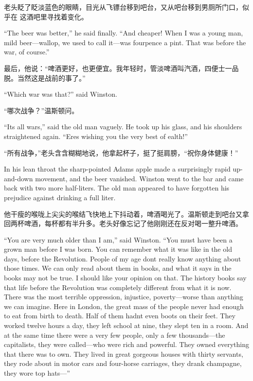 \begin{paracol}{2}
\switchcolumn

老头眨了眨淡蓝色的眼睛，目光从飞镖台移到吧台，又从吧台移到男厕所门口，似乎在
这酒吧里寻找着变化。

\switchcolumn*

``The beer was better,'' he said finally. ``And cheaper! When I was a young
man, mild beer---wallop, we used to call it---was fourpence a pint. That
was before the war, of course.''

\switchcolumn

最后，他说：``啤酒更好，也更便宜。我年轻时，管淡啤酒叫汽酒，四便士一品脱。当然这是战前的事了。''

\switchcolumn*

``Which war was that?'' said Winston.

\switchcolumn

``哪次战争？''温斯顿问。

\switchcolumn*

``It\textquotesingle s all wars,'' said the old man vaguely. He took up
his glass, and his shoulders straightened again.
``\textquotesingle Ere\textquotesingle s wishing you the very best of
\textquotesingle ealth!''

\switchcolumn

``所有战争，''老头含含糊糊地说，他拿起杯子，挺了挺肩膀，``祝你身体健康！''

\switchcolumn*

In his lean throat the sharp-pointed Adam\textquotesingle s apple made a
surprisingly rapid up-and-down movement, and the beer vanished. Winston
went to the bar and came back with two more half-liters. The old man
appeared to have forgotten his prejudice against drinking a full liter.

\switchcolumn

他干瘦的喉咙上尖尖的喉结飞快地上下抖动着，啤酒喝光了。温斯顿走到吧台又拿回两杯啤酒，每杯都有半升多。老头好像忘记了他刚刚还在反对喝一整升啤酒。

\switchcolumn*

``You are very much older than I am,'' said Winston. ``You must have been a
grown man before I was born. You can remember what it was like in the
old days, before the Revolution. People of my age don\textquotesingle t
really know anything about those times. We can only read about them in
books, and what it says in the books may not be true. I should like your
opinion on that. The history books say that life before the Revolution
was completely different from what it is now. There was the most
terrible oppression, injustice, poverty---worse than anything we can
imagine. Here in London, the great mass of the people never had enough
to eat from birth to death. Half of them hadn\textquotesingle t even
boots on their feet. They worked twelve hours a day, they left school at
nine, they slept ten in a room. And at the same time there were a very
few people, only a few thousands---the capitalists, they were
called---who were rich and powerful. They owned everything that there
was to own. They lived in great gorgeous houses with thirty servants,
they rode about in motor cars and four-horse carriages, they drank
champagne, they wore top hats---''


\end{paracol}
